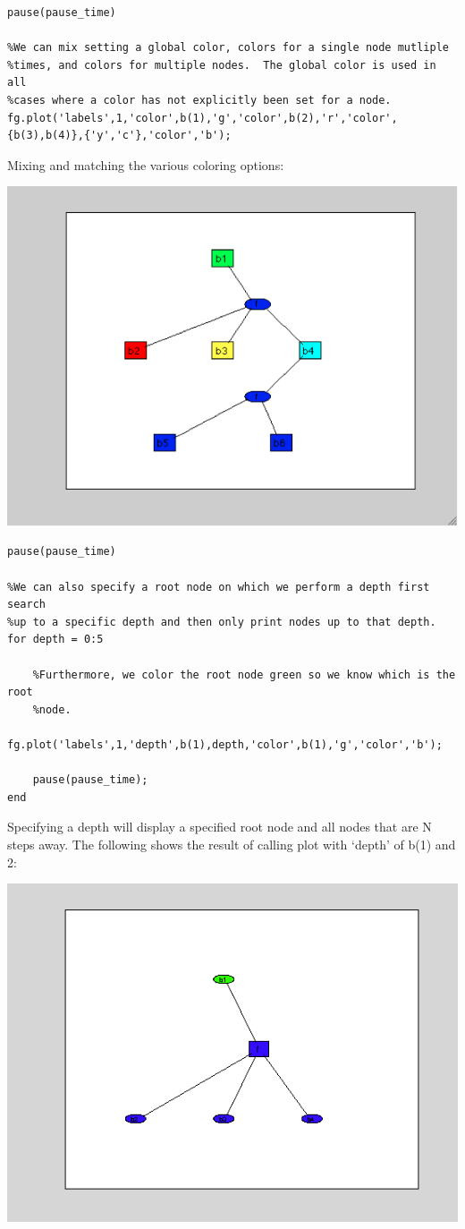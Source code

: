 \begin{lstlisting}
pause(pause_time)
 
%We can mix setting a global color, colors for a single node mutliple
%times, and colors for multiple nodes.  The global color is used in all
%cases where a color has not explicitly been set for a node.
fg.plot('labels',1,'color',b(1),'g','color',b(2),'r','color',{b(3),b(4)},{'y','c'},'color','b');
\end{lstlisting}

Mixing and matching the various coloring options:

\includegraphics{images/plot7.png}

\begin{lstlisting}
pause(pause_time)
 
%We can also specify a root node on which we perform a depth first search
%up to a specific depth and then only print nodes up to that depth.
for depth = 0:5
 
    %Furthermore, we color the root node green so we know which is the root
    %node.
    fg.plot('labels',1,'depth',b(1),depth,'color',b(1),'g','color','b');
    
    pause(pause_time);
end
\end{lstlisting}

Specifying a depth will display a specified root node and all nodes that are N steps away.  The following shows the result of calling plot with `depth' of b(1) and 2:
 

\includegraphics[width=.75\textwidth]{images/plot8.png}

